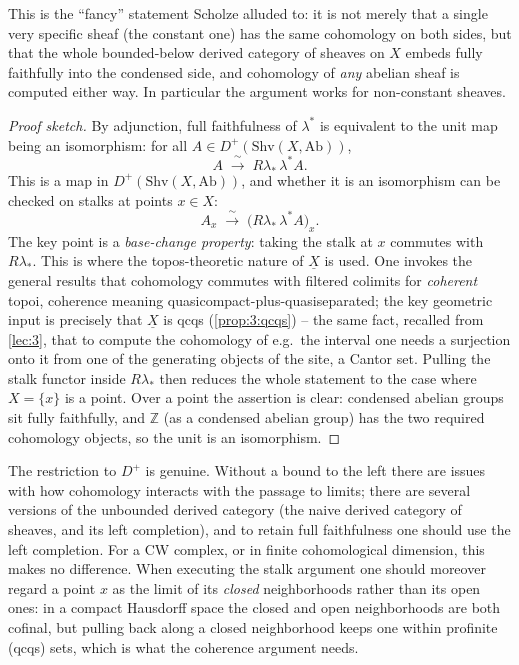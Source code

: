 \begin{remark}[Robustness]
\label{rmk:4:robustness}
This is the ``fancy'' statement Scholze alluded to: it is not merely that a
single very specific sheaf (the constant one) has the same cohomology on both
sides, but that the whole bounded-below derived category of sheaves on $X$
embeds fully faithfully into the condensed side, and cohomology of \emph{any}
abelian sheaf is computed either way. In particular the argument works for
non-constant sheaves.
\end{remark}

\begin{proof}[Proof sketch]
By adjunction, full faithfulness of $\lambda^\ast$ is equivalent to the unit map
being an isomorphism: for all $A\in D^{+}(\mathrm{Shv}(X,\mathrm{Ab}))$,
\begin{equation*}
A\;\xrightarrow{\ \sim\ }\;R\lambda_{\ast}\,\lambda^{\ast}A.
\end{equation*}
This is a map in $D^{+}(\mathrm{Shv}(X,\mathrm{Ab}))$, and whether it is an
isomorphism can be checked on stalks at points $x\in X$:
\begin{equation*}
A_{x}\;\xrightarrow{\ \sim\ }\;\bigl(R\lambda_{\ast}\,\lambda^{\ast}A\bigr)_{x}.
\end{equation*}
The key point is a \emph{base-change property}: taking the stalk at $x$ commutes
with $R\lambda_{\ast}$. This is where the topos-theoretic nature of
$\underline{X}$ is used. One invokes the general results that cohomology
commutes with filtered colimits for \emph{coherent} topoi, coherence meaning
quasicompact-plus-quasiseparated; the key geometric input is precisely that
$\underline{X}$ is qcqs (\cref{prop:3:qcqs}) -- the same fact, recalled from
\cref{lec:3}, that to compute the cohomology of e.g.\ the interval one needs a
surjection onto it from one of the generating objects of the site, a Cantor set.
Pulling the stalk functor inside $R\lambda_\ast$ then reduces the whole
statement to the case where $X=\{x\}$ is a point. Over a point the assertion is
clear: condensed abelian groups sit fully faithfully, and $\mathbb{Z}$ (as a
condensed abelian group) has the two required cohomology objects, so the unit is
an isomorphism.
\end{proof}

\begin{remark}
\label{rmk:4:bounded-below}
The restriction to $D^{+}$ is genuine. Without a bound to the left there are
issues with how cohomology interacts with the passage to limits; there are
several versions of the unbounded derived category (the naive derived category
of sheaves, and its left completion), and to retain full faithfulness one should
use the left completion. For a CW complex, or in finite cohomological dimension,
this makes no difference. When executing the stalk argument one should moreover
regard a point $x$ as the limit of its \emph{closed} neighborhoods rather than
its open ones: in a compact Hausdorff space the closed and open neighborhoods are
both cofinal, but pulling back along a closed neighborhood keeps one within
profinite (qcqs) sets, which is what the coherence argument needs.
\end{remark}

